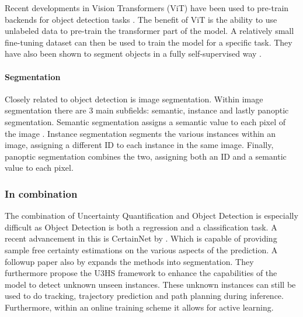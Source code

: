 Recent developments in Vision Transformers (ViT) \cite{dosovitskiy2021image} have been used to pre-train backends for object detection tasks \cite{carion2020endtoend}. The benefit of ViT is the ability to use unlabeled data to pre-train the transformer part of the model. A relatively small fine-tuning dataset can then be used to train the model for a specific task. They have also been shown to segment objects in a fully self-supervised way \cite{caron2021emerging}.

\paragraph*{Segmentation} Closely related to object detection is image segmentation. Within image segmentation there are 3 main subfields: semantic, instance and lastly panoptic segmentation. Semantic segmentation assigns a semantic value to each pixel of the image \cite{wu2016highperformance,xia2013semantic}. Instance segmentation segments the various instances within an image, assigning a different ID to each instance in the same image. Finally, panoptic segmentation combines the two, assigning both an ID and a semantic value to each pixel.

\subsubsection{In combination}\label{sec:broadliterature:combination}
The combination of Uncertainty Quantification and Object Detection is especially difficult as Object Detection is both a regression and a classification task. A recent advancement in this is CertainNet by \citep{Gasperini_2022}. Which is capable of providing sample free certainty estimations on the various aspects of the prediction. A followup paper also by \citep{gasperini2023segmenting} expands the methods into segmentation. They furthermore propose the U3HS framework to enhance the capabilities of the model to detect unknown unseen instances. These unknown instances can still be used to do tracking, trajectory prediction and path planning during inference. Furthermore, within an online training scheme it allows for active learning.


